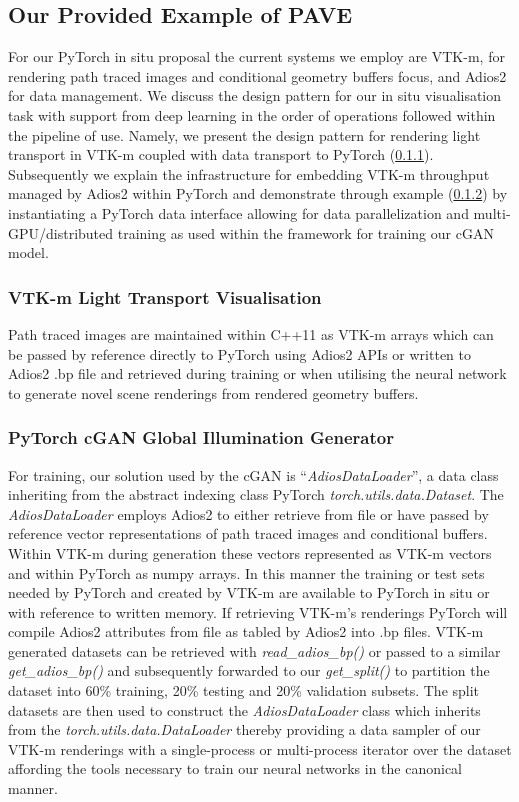 \documentclass[sigconf,authordraft]{acmart}%
\begin{document}
\subsection{Our Provided Example of PAVE}\label{ex}

For our PyTorch in situ proposal the current systems we employ are VTK-m, for rendering path traced images and conditional geometry buffers focus, and Adios2 for data management. We discuss the design pattern for our in situ visualisation task with support from deep learning in the order of operations followed within the pipeline of use. Namely, we present the design pattern for rendering light transport in VTK-m coupled with data transport to PyTorch (\ref{pathtracer}). Subsequently we explain the infrastructure for embedding VTK-m throughput managed by Adios2 within PyTorch and demonstrate through example (\ref{pytorch}) by  instantiating a PyTorch data interface allowing for data parallelization and multi-GPU/distributed training as used within the framework for training our cGAN model.

\subsubsection{VTK-m Light Transport Visualisation}\label{pathtracer}

Path traced images are maintained within C++11 as VTK-m arrays which can be passed by reference directly to PyTorch using Adios2 APIs or written to Adios2 .bp file and retrieved during training or when utilising the neural network to generate novel scene renderings from rendered geometry buffers. 

\subsubsection{PyTorch cGAN Global Illumination Generator}\label{pytorch}

For training, our solution used by the cGAN is ``{\it AdiosDataLoader}'', a data class inheriting from the abstract indexing class PyTorch {\it torch.utils.data.Dataset}. The {\it AdiosDataLoader} employs Adios2 to either retrieve from file or have passed by reference vector representations of path traced images and conditional buffers. Within VTK-m during generation these vectors represented as VTK-m vectors and within PyTorch as numpy arrays. In this manner the training or test sets needed by PyTorch and created by VTK-m are available to PyTorch in situ or with reference to written memory. If retrieving VTK-m's renderings PyTorch will compile Adios2 attributes from file as tabled by Adios2 into .bp files. VTK-m generated datasets can be retrieved with {\it read\_adios\_bp()} or passed to a similar {\it get\_adios\_bp()} and subsequently forwarded to our {\it get\_split()}  to partition the dataset into 60\% training, 20\% testing and 20\% validation subsets. The split datasets are then used to construct the {\it AdiosDataLoader} class which inherits from the {\it torch.utils.data.DataLoader} thereby providing a data sampler of our VTK-m renderings with a single-process or multi-process iterator over the dataset affording the tools necessary to train our neural networks in the canonical manner.
\end{document}
